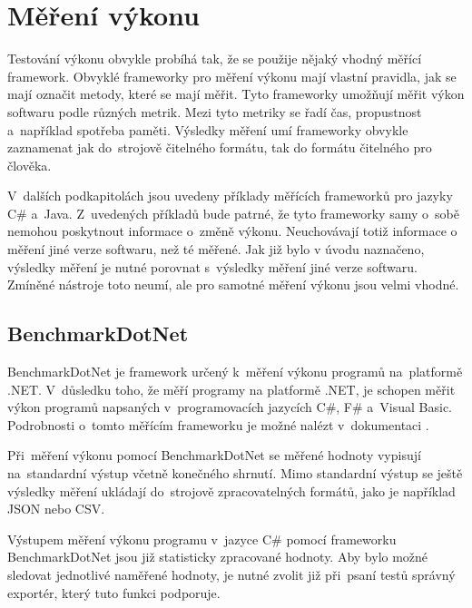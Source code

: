 \section{Měření výkonu}

Testování výkonu obvykle probíhá tak, že se použije nějaký vhodný měřící framework.
Obvyklé frameworky pro měření výkonu mají vlastní pravidla, jak se mají označit metody, které
se mají měřit. Tyto frameworky umožňují měřit výkon softwaru podle různých metrik. Mezi tyto metriky
se řadí čas, propustnost a~například spotřeba paměti. Výsledky měření umí frameworky obvykle zaznamenat jak do~strojově
čitelného formátu, tak do formátu čitelného pro člověka.

V~dalších podkapitolách jsou uvedeny příklady měřících frameworků pro jazyky C\# a~Java.
Z~uvedených příkladů bude patrné, že tyto frameworky samy o~sobě nemohou poskytnout informace o~změně výkonu.
Neuchovávají totiž informace o měření jiné verze softwaru, než té měřené. Jak již bylo v úvodu naznačeno,
výsledky měření je nutné porovnat s~výsledky měření jiné verze softwaru. Zmíněné nástroje toto neumí,
ale pro samotné měření výkonu jsou velmi vhodné.

\subsection{BenchmarkDotNet}

BenchmarkDotNet je framework určený k~měření výkonu programů na~platformě .NET. V~důsledku
toho, že měří programy na platformě .NET, je schopen měřit výkon programů napsaných
v~programovacích jazycích C\#, F\# a~Visual Basic. Podrobnosti o~tomto měřícím frameworku
je možné nalézt v~dokumentaci \cite[]{benchmarkDotNet}.

Při~měření výkonu pomocí BenchmarkDotNet se měřené hodnoty vypisují na~standardní výstup
včetně konečného shrnutí. Mimo standardní výstup se ještě výsledky měření ukládají
do~strojově zpracovatelných formátů, jako je například JSON nebo CSV.

Výstupem měření výkonu programu v~jazyce C\# pomocí frameworku BenchmarkDotNet jsou již statisticky zpracované hodnoty.
Aby bylo možné sledovat jednotlivé naměřené hodnoty, je nutné zvolit již při~psaní testů správný
exportér, který tuto funkci podporuje.

